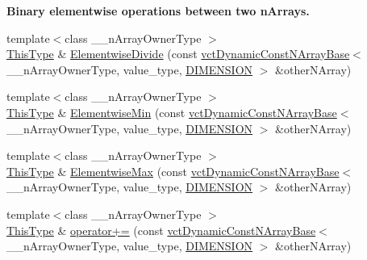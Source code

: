 \begin{Indent}{\bf Binary elementwise operations between two n\+Arrays.}
\begin{DoxyCompactItemize}
\item 
{\footnotesize template$<$class \+\_\+\+\_\+n\+Array\+Owner\+Type $>$ }\\\hyperlink{classvct_dynamic_const_n_array_base_a5123caffcf1455a1b99003877eade897}{This\+Type} \& \hyperlink{classvct_dynamic_n_array_base_ad8c7aae1f9f3e6a062e83219d1878f8f}{Elementwise\+Divide} (const \hyperlink{classvct_dynamic_const_n_array_base}{vct\+Dynamic\+Const\+N\+Array\+Base}$<$ \+\_\+\+\_\+n\+Array\+Owner\+Type, value\+\_\+type, \hyperlink{classvct_dynamic_n_array_base_aa66532d28588bdf26d08fb593db815d6abfcde386ec801b212d7c42d63a4f3837}{D\+I\+M\+E\+N\+S\+I\+O\+N} $>$ \&other\+N\+Array)
\item 
{\footnotesize template$<$class \+\_\+\+\_\+n\+Array\+Owner\+Type $>$ }\\\hyperlink{classvct_dynamic_const_n_array_base_a5123caffcf1455a1b99003877eade897}{This\+Type} \& \hyperlink{classvct_dynamic_n_array_base_a85e6f5675786bb1c81768d2d71a779ba}{Elementwise\+Min} (const \hyperlink{classvct_dynamic_const_n_array_base}{vct\+Dynamic\+Const\+N\+Array\+Base}$<$ \+\_\+\+\_\+n\+Array\+Owner\+Type, value\+\_\+type, \hyperlink{classvct_dynamic_n_array_base_aa66532d28588bdf26d08fb593db815d6abfcde386ec801b212d7c42d63a4f3837}{D\+I\+M\+E\+N\+S\+I\+O\+N} $>$ \&other\+N\+Array)
\item 
{\footnotesize template$<$class \+\_\+\+\_\+n\+Array\+Owner\+Type $>$ }\\\hyperlink{classvct_dynamic_const_n_array_base_a5123caffcf1455a1b99003877eade897}{This\+Type} \& \hyperlink{classvct_dynamic_n_array_base_a710b76f005b3bf51fa907cb8040232d3}{Elementwise\+Max} (const \hyperlink{classvct_dynamic_const_n_array_base}{vct\+Dynamic\+Const\+N\+Array\+Base}$<$ \+\_\+\+\_\+n\+Array\+Owner\+Type, value\+\_\+type, \hyperlink{classvct_dynamic_n_array_base_aa66532d28588bdf26d08fb593db815d6abfcde386ec801b212d7c42d63a4f3837}{D\+I\+M\+E\+N\+S\+I\+O\+N} $>$ \&other\+N\+Array)
\item 
{\footnotesize template$<$class \+\_\+\+\_\+n\+Array\+Owner\+Type $>$ }\\\hyperlink{classvct_dynamic_const_n_array_base_a5123caffcf1455a1b99003877eade897}{This\+Type} \& \hyperlink{classvct_dynamic_n_array_base_aa6e7153e2f5ac982c6b50572c79192ad}{operator+=} (const \hyperlink{classvct_dynamic_const_n_array_base}{vct\+Dynamic\+Const\+N\+Array\+Base}$<$ \+\_\+\+\_\+n\+Array\+Owner\+Type, value\+\_\+type, \hyperlink{classvct_dynamic_n_array_base_aa66532d28588bdf26d08fb593db815d6abfcde386ec801b212d7c42d63a4f3837}{D\+I\+M\+E\+N\+S\+I\+O\+N} $>$ \&other\+N\+Array)

\end{DoxyCompactItemize}
\end{Indent}
